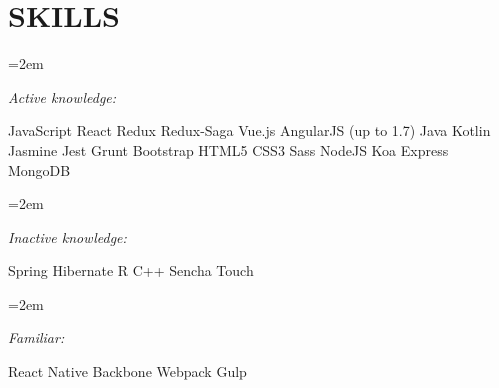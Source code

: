 \documentclass[paper=a4,fontsize=11pt]{scrartcl} %
\newlength{\spacebox}
\newcommand{\sepspace}{\vspace*{1em}}		%
\newcommand{\NewPart}[1]{\section*{\uppercase{#1}}}
\newcommand{\PersonalEntry}[2]{
		\noindent\hangindent=2em\hangafter=0 %
		\parbox{\spacebox}{        %
		\textit{#1}}		       %
		\hspace{1.5em} #2 \par}    %
\newcommand{\SkillsEntry}[2]{      %
		\noindent\hangindent=2em\hangafter=0 %
		\parbox{9em}{\textit{#1}}			   %
		\parbox{25em}{ \small #2 \normalsize \par} }
\begin{document}
\NewPart{Skills}{}

\SkillsEntry{Active knowledge:}{JavaScript \textbullet{} React \textbullet{} Redux \textbullet{} Redux-Saga \textbullet{} Vue.js \textbullet{} AngularJS (up to 1.7) \textbullet{} Java \textbullet{} Kotlin \textbullet{} Jasmine \textbullet{} Jest \textbullet{} Grunt \textbullet{} Bootstrap \textbullet{} HTML5 \textbullet{} CSS3 \textbullet Sass \textbullet{} NodeJS \textbullet{} Koa \textbullet{} Express \textbullet{} MongoDB}

\sepspace

\SkillsEntry{Inactive knowledge:}{Spring \textbullet{} Hibernate \textbullet{} R \textbullet{} C++ \textbullet{} Sencha Touch }

\sepspace

\SkillsEntry{Familiar:}{React Native \textbullet{} Backbone \textbullet{} Webpack \textbullet{} Gulp }
\end{document}
